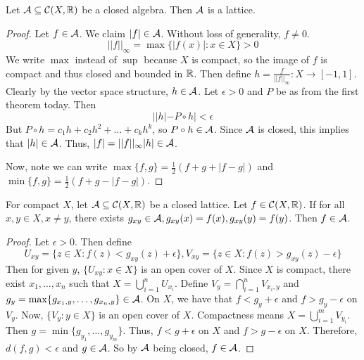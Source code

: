 \begin{theorem}
    Let $\mathcal{A} \subseteq \mathcal{C}(X, \operatorname{\mathbb{R}})$ be a closed algebra. Then $\mathcal{A}$ is a lattice.
    \begin{proof}
        Let $f \in \mathcal{A}$. We claim $|f| \in\mathcal{A}$. Without loss of generality, $f \neq 0$.
        \[ || f ||_{\infty} = \max\{|f(x)| : x \in X\} > 0 \]
        We write $\max$ instead of $\sup$
        because $X$ is compact, so the image of $f$ is compact and thus closed and bounded in $\operatorname{\mathbb{R}}$.
        Then define $h = \frac{f}{||f||_{\infty}} : X \to [-1, 1]$. Clearly by the vector space structure, $h \in \mathcal{A}$.
        Let $\epsilon > 0$ and $P$ be as from the first theorem today. Then
        \[ ||h| - P \circ h | < \epsilon \]
        But $P \circ h = c_1 h + c_2 h^2 + \dots + c_k h^k$, so $P \circ h \in \mathcal{A}$.
        Since $\mathcal{A}$ is closed, this implies that $|h| \in \mathcal{A}$. Thus, $|f| = ||f||_{\infty} |h| \in \mathcal{A}$.

        Now, note we can write $\max\{f, g\} = \frac{1}{2}(f + g + |f-g|)$ and $\min\{f, g\} = \frac{1}{2}(f + g - |f - g|)$.
    \end{proof}
\end{theorem}

\begin{theorem}
    For compact $X$, let $\mathcal{A} \subseteq \mathcal{C}(X, \operatorname{\mathbb{R}})$ be a closed lattice.
    Let $f \in \mathcal{C}(X, \operatorname{\mathbb{R}})$. If for all $ x, y \in X, x \neq y$,
    there exists $g_{xy} \in \mathcal{A}, g_{xy}(x) = f(x), g_{xy}(y) = f(y)$.
    Then $f \in \mathcal{A}$.
    \begin{proof}
        Let $\epsilon > 0$. Then define
        \[ U_{xy} = \{z \in X: f(z) < g_{xy}(z) + \epsilon\}, V_{xy} = \{z \in X: f(z) > g_{xy}(z) - \epsilon\} \]
        Then for given $y$, $\{U_{xy} : x\in X\}$ is an open cover of $X$.
        Since $X$ is compact, there exist $x_1, \dots, x_n$ such that $X = \bigcup_{i = 1}^n U_{x_i}$.
        Define $V_y = \bigcap_{i = 1}^n V_{x_i, y}$ and $g_y = \max\{g_{x_1, y}, \dots, g_{x_n, y}\} \in \mathcal{A}$.
        On $X$, we have that $f < g_y + \epsilon$ and $f > g_y - \epsilon$ on $V_y$.
        Now, $\{V_y: y\in X\}$ is an open cover of $X$. Compactness means $X = \bigcup_{i = 1}^{m } V_{y_i}$.
        Then $g = \min\{g_{y_1}, \dots, g_{y_m}\}$. Thus, $f < g + \epsilon$ on $X$ and $f > g - \epsilon$ on $X$.
        Therefore, $d(f, g) < \epsilon$ and $g \in \mathcal{A}$. So by $\mathcal{A}$ being closed, $f \in \mathcal{A}$.
    \end{proof}
\end{theorem}

